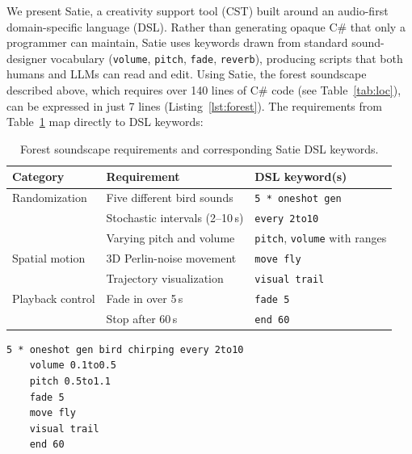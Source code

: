 \documentclass[sigconf,anonymous,review]{nimeart}
\begin{document}
We present Satie, a creativity support tool (CST) built around an audio-first domain-specific language (DSL). Rather than generating opaque C\# that only a programmer can maintain, Satie uses keywords drawn from standard sound-designer vocabulary (\texttt{volume}, \texttt{pitch}, \texttt{fade}, \texttt{reverb}), producing scripts that both humans and LLMs can read and edit. Using Satie, the forest soundscape described above, which requires over 140 lines of C\# code (see Table~\ref{tab:loc}), can be expressed in just 7 lines (Listing~\ref{lst:forest}). The requirements from Table~\ref{tab:forest-requirements} map directly to DSL keywords:

\begin{table}[htbp]
\centering
\small
\begin{tabular}{lll}
\toprule
\textbf{Category} & \textbf{Requirement} & \textbf{DSL keyword(s)} \\
\midrule
Randomization & Five different bird sounds & \texttt{5 * oneshot gen} \\
              & Stochastic intervals (2--10\,s) & \texttt{every 2to10} \\
              & Varying pitch and volume & \texttt{pitch}, \texttt{volume} with ranges \\
Spatial motion & 3D Perlin-noise movement & \texttt{move fly} \\
               & Trajectory visualization & \texttt{visual trail} \\
Playback control & Fade in over 5\,s & \texttt{fade 5} \\
                 & Stop after 60\,s & \texttt{end 60} \\
\bottomrule
\end{tabular}
\caption{Forest soundscape requirements and corresponding Satie DSL keywords.}
\label{tab:forest-requirements}
\end{table}

\begin{lstlisting}[language=satie,caption={Complete forest soundscape in Satie. Seven lines satisfy all requirements from Table~\ref{tab:forest-requirements}: \texttt{gen} generates audio from a text prompt, \texttt{5~*} creates five unique variants, randomized \texttt{volume} and \texttt{pitch} ranges add per-event variation, \texttt{move~fly} drives Perlin-noise trajectories, and \texttt{end~60} stops playback after one minute.},label=lst:forest]
5 * oneshot gen bird chirping every 2to10
    volume 0.1to0.5
    pitch 0.5to1.1
    fade 5
    move fly
    visual trail
    end 60
\end{lstlisting}
\end{document}
